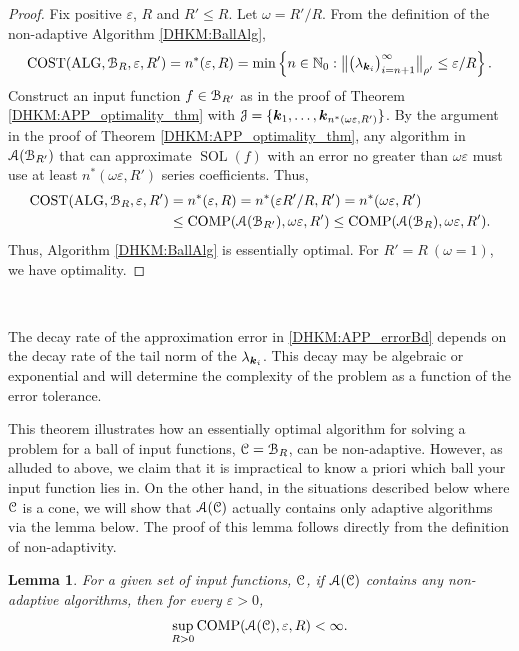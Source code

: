 \documentclass[USenglish]{article}
\theoremstyle{dgthm}
\theoremstyle{dgthm}
\newtheorem{lemma}{Lemma}
\theoremstyle{dgthm}
\theoremstyle{dgthm}
\theoremstyle{dgdef}
\theoremstyle{definition}
\DeclareMathOperator{\SOL}{SOL}
\DeclareMathOperator{\ALG}{ALG}
\DeclareMathOperator{\COST}{COST}
\DeclareMathOperator{\COMP}{COMP}
\newcommand{\bignorm}[2][{}]{\ensuremath{\bigl \lVert #2 \bigr \rVert}_{#1}}
\begin{document}
\begin{proof}  Fix positive $\varepsilon$, $R$ and $R' \le R$.  Let $\omega = R'/R$.  From the definition of the non-adaptive Algorithm  \ref{DHKM:BallAlg}, 
\[
\COST(\ALG, \calB_R, \varepsilon,R') = n^*(\varepsilon,R) = \min \left \{n \in \N_0 : \bignorm[\rho']{\bigl(  \lambda_{\bsk_i}  \bigr)_{i = n+1}^{\infty}} \le \varepsilon /R \right \}.
\]
Construct an input function $f \in {\mathcal{B}}_{R'}$ as in the proof of Theorem \ref{DHKM:APP_optimality_thm} with ${\mathcal{J}} = \{{\boldsymbol{k}}_1, \ldots, {\boldsymbol{k}}_{n^*(\omega \varepsilon,R')} \}$. By the argument in the proof of Theorem \ref{DHKM:APP_optimality_thm}, any algorithm in ${\mathcal{A}}({\mathcal{B}}_{R'})$ that can approximate $\SOL(f)$ with an error no greater than $\omega \varepsilon$ must use at least $n^*(\omega \varepsilon,R')$ series coefficients.  Thus, 
\begin{align*}
\COST(\ALG, \calB_R, \varepsilon,R') & =  n^*(\varepsilon,R) 
= n^*(\varepsilon R'/R,R') = n^*(\omega \varepsilon, R')
\\
& \le \COMP(\calA(\calB_{R'}),\omega \varepsilon, R') \le  \COMP(\calA(\calB_{R}),\omega \varepsilon, R').
\end{align*}
Thus, Algorithm \ref{DHKM:BallAlg} is essentially optimal. For $R'=R \ (\omega = 1)$, we have optimality.
\end{proof} \

The decay rate of the approximation error in \eqref{DHKM:APP_errorBd} depends on the decay rate of the tail norm of the $\lambda_{{\boldsymbol{k}}_i}$.  This decay may be algebraic or exponential and will determine the complexity of the problem as a function of the error tolerance.  


This theorem illustrates how an essentially optimal algorithm for solving a problem for a ball of input functions, ${\mathcal{C}} = {\mathcal{B}}_R$, can be non-adaptive.  However, as alluded to above, we claim that it is impractical to know a priori which ball your input function lies in.  On the other hand, in the situations described below where ${\mathcal{C}}$ is a cone, we will show that ${\mathcal{A}}({\mathcal{C}})$ actually contains only adaptive algorithms via the lemma below.  The proof of this lemma follows directly from the definition of non-adaptivity.

\begin{lemma} \label{DHKM:NoNonAdpatLem}
For a given set of input functions, ${\mathcal{C}}$, if  ${\mathcal{A}}({\mathcal{C}})$ contains any non-adaptive algorithms, then for every $\varepsilon > 0$,
\begin{equation*}
    \sup_{R > 0} \COMP(\calA(\calC),\varepsilon, R) < \infty.
\end{equation*}
\end{lemma}
\end{document}
